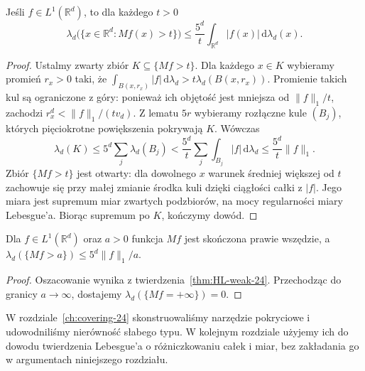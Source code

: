 \begin{twierdzenie}
\label{thm:HL-weak-24}
Jeśli $f\in L^1(\mathbb R^d)$, to dla każdego $t>0$
\[
 \lambda_d\bigl(\{x\in\mathbb R^d:Mf(x)>t\}\bigr)
 \le\frac{5^d}{t}\int_{\mathbb R^d}|f(x)|\,
 \mathrm d\lambda_d(x).
\]
\end{twierdzenie}
\begin{proof}
Ustalmy zwarty zbiór $K\subseteq\{Mf>t\}$.
Dla każdego $x\in K$ wybieramy promień $r_x>0$ taki,
że $\int_{B(x,r_x)}|f|\,\mathrm d\lambda_d>
 t\lambda_d(B(x,r_x))$. Promienie takich kul są
ograniczone z góry: ponieważ ich objętość jest mniejsza
od $\|f\|_1/t$, zachodzi $r_x^d<\|f\|_1/(tv_d)$.
Z lematu $5r$ wybieramy rozłączne kule $(B_j)$, których
pięciokrotne powiększenia pokrywają $K$. Wówczas
\[
 \lambda_d(K)\le5^d\sum_j\lambda_d(B_j)
 <\frac{5^d}{t}\sum_j\int_{B_j}|f|\,\mathrm d\lambda_d
 \le\frac{5^d}{t}\|f\|_1.
\]
Zbiór $\{Mf>t\}$ jest otwarty: dla dowolnego $x$
warunek średniej większej od $t$ zachowuje się przy małej
zmianie środka kuli dzięki ciągłości całki z $|f|$.
Jego miara jest supremum miar zwartych podzbiorów,
na mocy regularności miary Lebesgue'a. Biorąc supremum
po $K$, kończymy dowód.
\end{proof}

\begin{wniosek}
\label{cor:HL-level-24}
Dla $f\in L^1(\mathbb R^d)$ oraz $a>0$ funkcja $Mf$
jest skończona prawie wszędzie, a
$\lambda_d(\{Mf>a\})\le5^d\|f\|_1/a$.
\end{wniosek}
\begin{proof}
Oszacowanie wynika z twierdzenia~\ref{thm:HL-weak-24}.
Przechodząc do granicy $a\to\infty$, dostajemy
$\lambda_d(\{Mf=+\infty\})=0$.
\end{proof}

\begin{uwaga}
W rozdziale~\ref{ch:covering-24} skonstruowaliśmy narzędzie
pokryciowe i udowodniliśmy nierówność słabego typu.
W kolejnym rozdziale użyjemy ich do dowodu twierdzenia
Lebesgue'a o różniczkowaniu całek i miar, bez zakładania
go w argumentach niniejszego rozdziału.
\end{uwaga}
